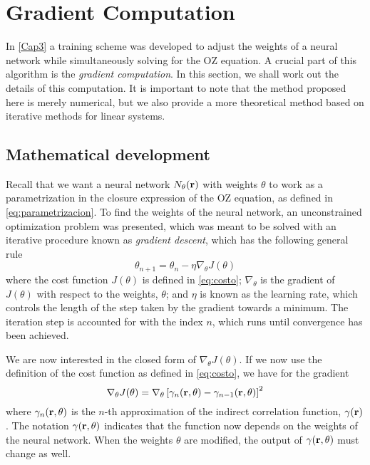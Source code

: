 \chapter{Gradient Computation}
\label{AppendixA}

In \autoref{Cap3} a training scheme was developed to adjust the weights of a neural
network while simultaneously solving for the OZ equation. A crucial part of
this algorithm is the \emph{gradient computation}. In this section, we shall work
out the details of this computation. It is important to note that the method proposed
here is merely numerical, but we also provide a more theoretical method based on
iterative methods for linear systems.

\section{Mathematical development}
Recall that we want a neural network $N_{\theta}(\mathbf{r})$ with weights $\theta$ to work as a
parametrization in the closure expression of the OZ equation, as defined in
\autoref{eq:parametrizacion}. To find the weights of the neural network, an
unconstrained optimization problem was presented, which was meant to be solved with
an iterative procedure known as \emph{gradient descent}, which has the following
general rule
\[
\theta_{n+1} = \theta_{n} - \eta \nabla_{\theta} J(\theta)
\]
where the cost function $J(\theta)$ is defined in \autoref{eq:costo}; $\nabla_{\theta}$
is the gradient of $J(\theta)$ with respect to the weights, $\theta$; and $\eta$ is known
as the learning rate, which controls the length of the step taken by the gradient
towards a minimum. The iteration step is accounted for with the index $n$, which runs until
convergence has been achieved.

We are now interested in the closed form of $\nabla_{\theta} J(\theta)$. If we now use the
definition of the cost function as defined in \autoref{eq:costo}, we have for the
gradient
\begin{equation}
    \nabla_{\theta} J(\theta) = \nabla_{\theta} \left[\gamma_{n}(\mathbf{r}, \theta) - \gamma_{n-1}(\mathbf{r}, \theta) \right]^2
    \label{eq:grad1}
\end{equation}
where $\gamma_{n}(\mathbf{r}, \theta)$ is the $n$-th approximation of the indirect
correlation function, $\gamma(\mathbf{r})$.
The notation $\gamma(\mathbf{r}, \theta)$ indicates that the function now depends
on the weights of the neural network. When the weights $\theta$ are modified, the output of
$\gamma(\mathbf{r}, \theta)$ must change as well.

